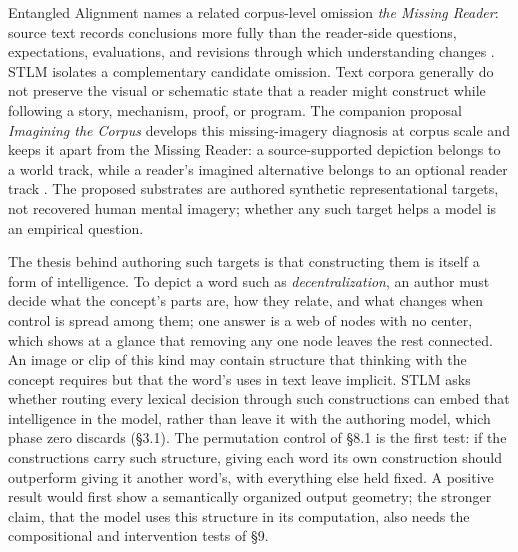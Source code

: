 \documentclass[11pt,a4paper]{article}
\begin{document}
Entangled Alignment names a related corpus-level omission \emph{the Missing Reader}: source text records conclusions more fully than the reader-side questions, expectations, evaluations, and revisions through which understanding changes \cite{entangledalignment2026}. STLM isolates a complementary candidate omission. Text corpora generally do not preserve the visual or schematic state that a reader might construct while following a story, mechanism, proof, or program. The companion proposal \emph{Imagining the Corpus} develops this missing-imagery diagnosis at corpus scale and keeps it apart from the Missing Reader: a source-supported depiction belongs to a world track, while a reader's imagined alternative belongs to an optional reader track \cite{documentworld2026}. The proposed substrates are authored synthetic representational targets, not recovered human mental imagery; whether any such target helps a model is an empirical question.

The thesis behind authoring such targets is that constructing them is itself a form of intelligence. To depict a word such as \emph{decentralization}, an author must decide what the concept's parts are, how they relate, and what changes when control is spread among them; one answer is a web of nodes with no center, which shows at a glance that removing any one node leaves the rest connected. An image or clip of this kind may contain structure that thinking with the concept requires but that the word's uses in text leave implicit. STLM asks whether routing every lexical decision through such constructions can embed that intelligence in the model, rather than leave it with the authoring model, which phase zero discards (§3.1). The permutation control of §8.1 is the first test: if the constructions carry such structure, giving each word its own construction should outperform giving it another word's, with everything else held fixed. A positive result would first show a semantically organized output geometry; the stronger claim, that the model uses this structure in its computation, also needs the compositional and intervention tests of §9.
\end{document}
